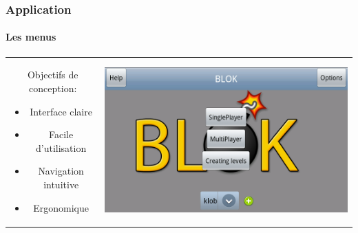 	\begin{frame}
	\frametitle{Application}
	\framesubtitle{Les menus}
	
	\begin{center}
		\begin{tabular}{cc}
			\begin{minipage}{4cm}
				\begin{block}{Objectifs de conception:}
					\begin{itemize}
					  \item Interface claire
					  \item Facile d'utilisation
					  \item Navigation intuitive
					  \item Ergonomique
					\end{itemize}
				\end{block}
			\end{minipage} &
			\begin{minipage}{8cm}
				 \includegraphics[scale=0.25]{img/2.png}
			\end{minipage}\\
		\end{tabular}
	\end{center}
	
		
	\end{frame}

%	
%
%		
%	
	

